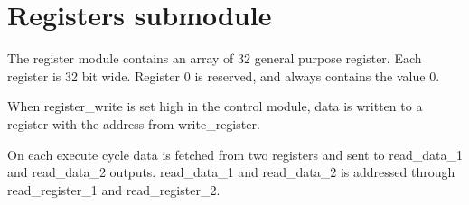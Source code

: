 \section{Registers submodule}
The register module contains an array of 32 general purpose register. Each register is 32 bit wide. Register 0 is reserved, and always contains the value 0.

When register{\_}write is set high in the control module, data is written to a register with the address from write{\_}register.

On each execute cycle data is fetched from two registers and sent to read{\_}data{\_}1 and read{\_}data{\_}2 outputs. read{\_}data{\_}1 and read{\_}data{\_}2 is addressed through read{\_}register{\_}1 and read{\_}register{\_}2.

